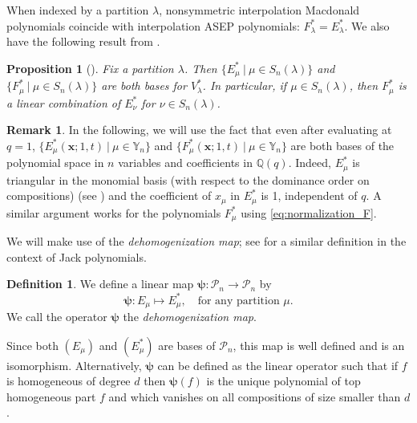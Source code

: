 \documentclass[12pt]{amsart}
\newtheorem{prop}[thm]{Proposition}
\theoremstyle{definition}
\newtheorem{definition}[thm]{Definition}
\newtheorem{remark}[thm]{Remark}
\newcommand{\bfx}{\boldsymbol{x}}
\newcommand{\mcP}{\mathcal P}
\newcommand{\QQ}{\mathbb Q}
\newcommand{\VV}{V_{\lambda}^*}
\newcommand{\YY}{\mathbb Y}
\begin{document}
\begin{appendices}

When indexed by a partition $\lambda$, nonsymmetric interpolation Macdonald polynomials coincide with interpolation ASEP polynomials: $F^*_\lambda=E^*_\lambda$. We also have the following 
result from \cite[Lemma 2.5 and Proposition 2.14]{BenDaliWilliams2025}.
\begin{prop}[\cite{BenDaliWilliams2025}]\label{prop:Vstar}
    Fix  a partition $\lambda$. Then $\{E_{\mu}^* \ \vert \ \mu\in S_n(\lambda)\}$ and $\{F_{\mu}^* \ \vert \ \mu\in S_n(\lambda)\}$ are both bases for $\VV$. In particular, if $\mu\in S_n(\lambda)$, then $F^*_\mu$ is a linear combination of $E_{\nu}^*$ for $\nu\in S_n(\lambda)$.
\end{prop}
\begin{remark}\label{rmk:basis_1}
In the following, we will use the fact that even after evaluating at $q=1$, $\{E^*_\mu(\bfx;1,t) \ \vert \ {\mu\in \YY_n}\}$ and $\{F^*_\mu(\bfx;1,t) \ \vert \ {\mu\in \YY_n}\}$  are both bases of the polynomial space in $n$ variables and coefficients in $\QQ(q)$. Indeed, $E^*_\mu$ is triangular in the monomial basis (with respect to the dominance order on compositions) (see \cite[Theorem 3.11]{Knop1997b}) and the coefficient of $x_\mu$ in $E^*_\mu$ is 1, independent of $q$. A similar argument works for the polynomials $F^*_\mu$ using \cref{eq:normalization_F}.
\end{remark}

    

We will make use of the \emph{dehomogenization map}; see \cite[Definition 3.1 and Theorem 3.8]{NakviSahiSergel2023} for a similar definition in the context of Jack polynomials.
\begin{definition}\label{def:dehom}
We define a linear map $\boldsymbol{\psi}:\mcP_n \to \mcP_n$ 
by 
\begin{equation}
 \boldsymbol{\psi}: E_\mu\mapsto E_\mu^*, \quad\text{for any partition $\mu$.}   
\end{equation}
We call the operator $\boldsymbol{\psi}$ the \emph{dehomogenization map}.
\end{definition}

Since both $(E_\mu)$ and $(E_\mu^*)$ are bases of $\mcP_n$, this map is well defined and is an isomorphism.
Alternatively, $\boldsymbol{\psi}$ can be defined as the linear operator such that if $f$ is homogeneous of degree $d$ then $\boldsymbol{\psi}(f)$ is the unique polynomial of top homogeneous part $f$ and which vanishes on all compositions of size smaller than $d$. 


\end{appendices}
\end{document}
